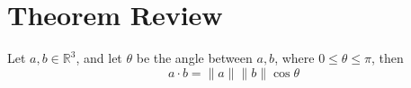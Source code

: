 \documentclass[openany]{book}
\newcommand{\R}{\mathbb{R}}
\begin{document}











































\newpage

\chapter{Theorem Review}
\begin{prop}\label{dot}
    Let $a,b\in\R^3$, and let $\theta$ be the angle between $a,b$, where $0\leq\theta\leq\pi$, then 
    \begin{equation*}
        a\cdot b=\|a\|\|b\|\cos\theta
    \end{equation*}
\end{prop}
\end{document}
